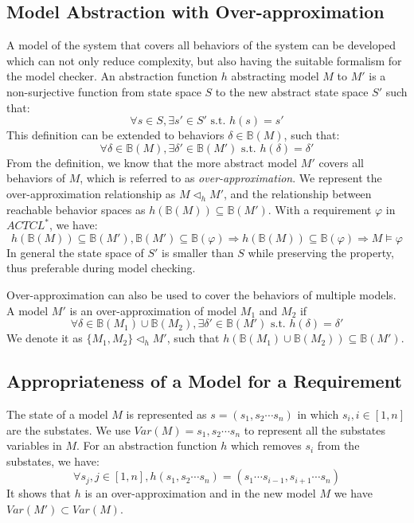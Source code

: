 \subsection{Model Abstraction with Over-approximation}
A model of the system that covers all behaviors of the system can be developed which can not only reduce complexity, but also having the suitable formalism for the model checker. An abstraction function $h$ abstracting model $M$ to $M'$ is a non-surjective function from state space $S$ to the new abstract state space $S'$ such that: 
$$\forall s\in S, \exists s'\in S' \text{ s.t. } h(s)=s'$$
This definition can be extended to behaviors $\delta\in \mathbb{B}(M)$, such that:
$$\forall \delta\in \mathbb{B}(M),\exists \delta'\in\mathbb{B}(M')\text{ s.t. } h(\delta)=\delta'$$
From the definition, we know that the more abstract model $M'$ covers all behaviors of $M$, which is referred to as \emph{over-approximation}. We represent the over-approximation relationship as $M\triangleleft_h M'$, and the relationship between reachable behavior spaces as $h(\mathbb{B}(M))\subseteq\mathbb{B}(M')$. With a requirement $\varphi$ in $ACTCL^*$, we have:
$$h(\mathbb{B}(M))\subseteq \mathbb{B}(M'),\mathbb{B}(M')\subseteq \mathbb{B}(\varphi)\Rightarrow h(\mathbb{B}(M))\subseteq \mathbb{B}(\varphi)\Rightarrow M\models\varphi$$
In general the state space of $S'$ is smaller than $S$ while preserving the property, thus preferable during model checking. 

Over-approximation can also be used to cover the behaviors of multiple models. A model $M'$ is an over-approximation of model $M_1$ and $M_2$ if 
$$\forall \delta\in \mathbb{B}(M_1)\cup\mathbb{B}(M_2),\exists \delta'\in\mathbb{B}(M')\text{ s.t. } h(\delta)=\delta'$$
We denote it as $\{M_1,M_2\}\triangleleft_h M'$, such that $h(\mathbb{B}(M_1)\cup\mathbb{B}(M_2))\subseteq\mathbb{B}(M')$.

\subsection{Appropriateness of a Model for a Requirement}
The state of a model $M$ is represented as $s=(s_1,s_2\cdots s_n)$ in which $s_i, i\in [1,n]$ are the substates. We use $Var(M)={s_1,s_2\cdots s_n}$ to represent all the substates variables in $M$. For an abstraction function $h$ which removes $s_i$ from the substates, we have:
$$\forall s_j,j\in [1,n], h(s_1,s_2\cdots s_n)=(s_1\cdots s_{i-1},s_{i+1}\cdots s_n)$$
It shows that $h$ is an over-approximation and in the new model $M$ we have $Var(M')\subset Var(M)$.

